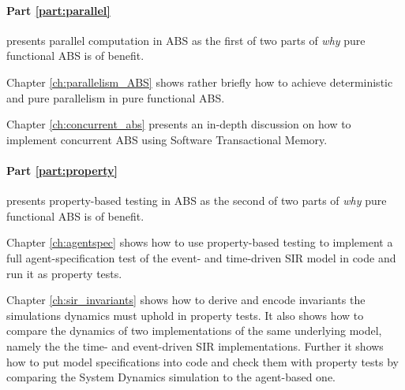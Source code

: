 

\medskip

\paragraph{Part \ref{part:parallel}} presents parallel computation in ABS as the first of two parts of \textit{why} pure functional ABS is of benefit.
\medskip

Chapter \ref{ch:parallelism_ABS} shows rather briefly how to achieve deterministic and pure parallelism in pure functional ABS. 

\medskip

Chapter \ref{ch:concurrent_abs} presents an in-depth discussion on how to implement concurrent ABS using Software Transactional Memory.

\medskip

\paragraph{Part \ref{part:property}} presents property-based testing in ABS as the second of two parts of \textit{why} pure functional ABS is of benefit.
\medskip

Chapter \ref{ch:agentspec} shows how to use property-based testing to implement a full agent-specification test of the event- and time-driven SIR model in code and run it as property tests.

\medskip

Chapter \ref{ch:sir_invariants} shows how to derive and encode invariants the simulations dynamics must uphold in property tests. It also shows how to compare the dynamics of two implementations of the same underlying model, namely the the time- and event-driven SIR implementations. Further it shows how to put model specifications into code and check them with property tests by comparing the System Dynamics simulation to the agent-based one.

